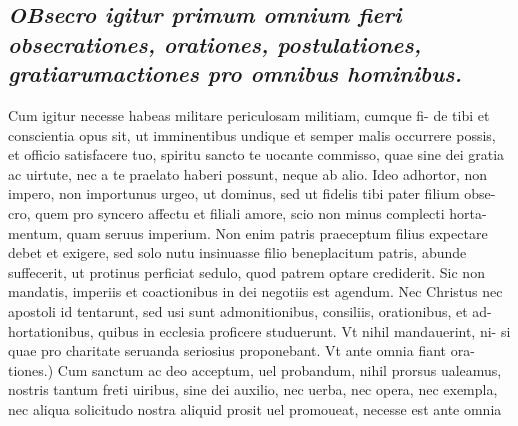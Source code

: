 \documentclass{article}
\begin{document}
\begin{pages}
\subsection*{\textit{\huge\textbf{O}\normalsize Bsecro igitur primum omnium fieri obsecrationes, orationes, postulationes, gratiarumactiones pro omnibus hominibus. }}\pstart Cum igitur necesse habeas militare periculosam militiam, cumque fi- de tibi et conscientia opus sit, ut imminentibus undique et semper malis occurrere possis, et officio satisfacere tuo, spiritu sancto te uocante commisso, quae sine dei gratia ac uirtute, nec a te praelato haberi possunt, neque ab alio. Ideo adhortor, non impero, non importunus urgeo, ut dominus, sed ut fidelis tibi pater filium obse- cro, quem pro syncero affectu et filiali amore, scio non minus complecti horta- mentum, quam seruus imperium. Non enim patris praeceptum filius expectare debet et exigere, sed solo nutu insinuasse filio beneplacitum patris, abunde suffecerit, ut protinus perficiat sedulo, quod patrem optare crediderit. Sic non mandatis, imperiis et coactionibus in dei negotiis est agendum. Nec Christus nec apostoli id tentarunt, sed usi sunt admonitionibus, consiliis, orationibus, et ad- hortationibus, quibus in ecclesia proficere studuerunt. Vt nihil mandauerint, ni- si quae pro charitate seruanda seriosius proponebant. Vt ante omnia fiant ora- tiones.) Cum sanctum ac deo acceptum, uel probandum, nihil prorsus ualeamus, nostris tantum freti uiribus, sine dei auxilio, nec uerba, nec opera, nec exempla, nec aliqua solicitudo nostra aliquid prosit uel promoueat, necesse est ante omnia  \pend

\end{pages}
\end{document}
